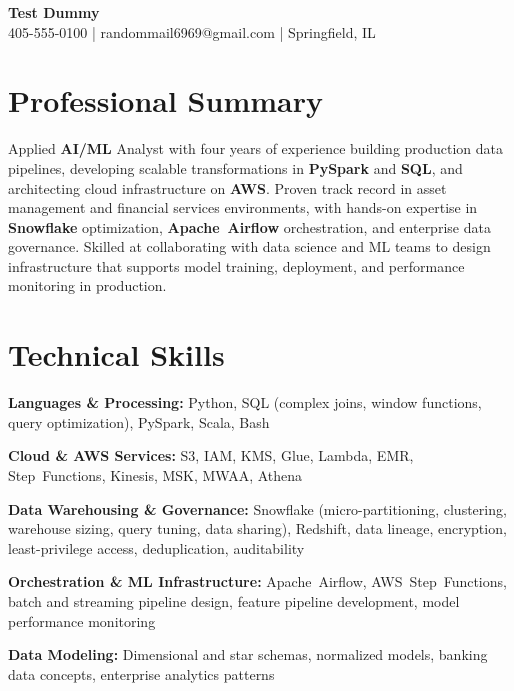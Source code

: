 \documentclass[\rFontPt pt,letterpaper]{extarticle}
\begin{document}
\begin{center}
{\LARGE\bfseries Test Dummy}\\[2pt]
405-555-0100 \quad | \quad randommail6969@gmail.com \quad | \quad Springfield, IL
\end{center}
\vspace{2pt}

\section{Professional Summary}
Applied \textbf{\mbox{AI/ML}} Analyst with four years of experience building production data pipelines, developing scalable transformations in \textbf{\mbox{PySpark}} and \textbf{\mbox{SQL}}, and architecting cloud infrastructure on \textbf{\mbox{AWS}}. Proven track record in asset management and financial services environments, with hands-on expertise in \textbf{\mbox{Snowflake}} optimization, \textbf{\mbox{Apache Airflow}} orchestration, and enterprise data governance. Skilled at collaborating with data science and ML teams to design infrastructure that supports model training, deployment, and performance monitoring in production.

\section{Technical Skills}
\textbf{Languages \& Processing:} \mbox{Python}, \mbox{SQL} (complex joins, window functions, query optimization), \mbox{PySpark}, \mbox{Scala}, \mbox{Bash}

\textbf{Cloud \& AWS Services:} \mbox{S3}, \mbox{IAM}, \mbox{KMS}, \mbox{Glue}, \mbox{Lambda}, \mbox{EMR}, \mbox{Step Functions}, \mbox{Kinesis}, \mbox{MSK}, \mbox{MWAA}, \mbox{Athena}

\textbf{Data Warehousing \& Governance:} \mbox{Snowflake} (micro-partitioning, clustering, warehouse sizing, query tuning, data sharing), \mbox{Redshift}, data lineage, encryption, least-privilege access, deduplication, auditability

\textbf{Orchestration \& ML Infrastructure:} \mbox{Apache Airflow}, \mbox{AWS Step Functions}, batch and streaming pipeline design, feature pipeline development, model performance monitoring

\textbf{Data Modeling:} Dimensional and star schemas, normalized models, banking data concepts, enterprise analytics patterns
\end{document}
